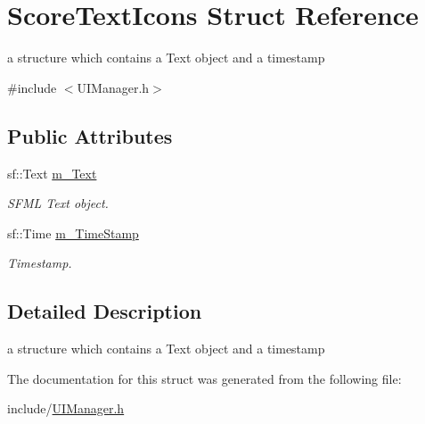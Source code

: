 \hypertarget{struct_score_text_icons}{\section{Score\+Text\+Icons Struct Reference}
\label{struct_score_text_icons}
}


a structure which contains a Text object and a timestamp  




{\ttfamily \#include $<$U\+I\+Manager.\+h$>$}

\subsection*{Public Attributes}
\begin{DoxyCompactItemize}
\item 
\hypertarget{struct_score_text_icons_af53518203f5368f0c646bc27f25cdb59}{sf\+::\+Text \hyperlink{struct_score_text_icons_af53518203f5368f0c646bc27f25cdb59}{m\+\_\+\+Text}}\label{struct_score_text_icons_af53518203f5368f0c646bc27f25cdb59}

\begin{DoxyCompactList}\small\item\em S\+F\+M\+L Text object. \end{DoxyCompactList}\item 
\hypertarget{struct_score_text_icons_aca94e73ec80d89215aace3f607997f4b}{sf\+::\+Time \hyperlink{struct_score_text_icons_aca94e73ec80d89215aace3f607997f4b}{m\+\_\+\+Time\+Stamp}}\label{struct_score_text_icons_aca94e73ec80d89215aace3f607997f4b}

\begin{DoxyCompactList}\small\item\em Timestamp. \end{DoxyCompactList}\end{DoxyCompactItemize}


\subsection{Detailed Description}
a structure which contains a Text object and a timestamp 

The documentation for this struct was generated from the following file\+:\begin{DoxyCompactItemize}
\item 
include/\hyperlink{_u_i_manager_8h}{U\+I\+Manager.\+h}\end{DoxyCompactItemize}
